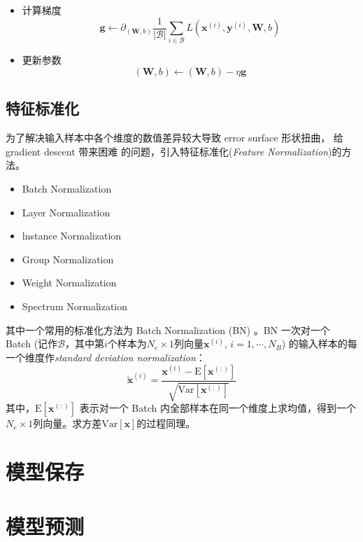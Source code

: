     \begin{itemize}
        \item 计算梯度
            \begin{equation}
                \bm{g} \leftarrow \partial_{(\bm{W},b)} \frac{1}{|\mathcal{B}|} \sum_{i\in\mathcal{B}}{L\left(\bm{x}^{(i)},\bm{y}^{(i)},\bm{W},b\right)}
            \end{equation}
        \item 更新参数
            \begin{equation}
                (\bm{W},b) \leftarrow (\bm{W},b) - \eta \bm{g} 
            \end{equation}
    \end{itemize}


    \subsection{特征标准化}

    为了解决输入样本中各个维度的数值差异较大导致 error surface 形状扭曲， 给 gradient descent 带来困难 的问题，引入特征标准化(\emph{Feature Normalization})的方法。

    \begin{itemize}
        \item Batch Normalization
        \item Layer Normalization
        \item lnstance Normalization
        \item Group Normalization
        \item Weight Normalization
        \item Spectrum Normalization
    \end{itemize}

    其中一个常用的标准化方法为 Batch Normalization (BN) 。BN 一次对一个 Batch (记作$\mathcal{B}$，其中第$i$个样本为$N_e\times 1$列向量$\bm{x}^{(i)},\,i=1,\cdots,N_B$) 的输入样本的每一个维度作\emph{standard deviation normalization}：
    \begin{equation}
        \tilde{\bm{x}}^{(i)}=\frac{\bm{x}^{(i)}-\mathrm{E}\left[\bm{x}^{(:)}\right]}{\sqrt{\mathrm{Var}\left[\bm{x}^{(:)}\right]}}
    \end{equation}
    其中，$\mathrm{E}\left[\bm{x}^{(:)}\right]$ 表示对一个 Batch 内全部样本在同一个维度上求均值，得到一个$N_e\times 1$列向量。求方差$\mathrm{Var}\left[\bm{x}\right]$的过程同理。
        
\section{模型保存}


\section{模型预测}